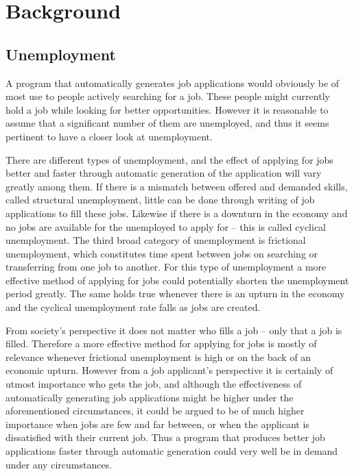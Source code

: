 \section{Background}\label{sec:background}

\subsection{Unemployment}

A program that automatically generates job applications would obviously be of
most use to people actively searching for a job. These people might currently
hold a job while looking for better opportunities. However it is reasonable to
assume that a significant number of them are unemployed, and thus it seems
pertinent to have a closer look at unemployment.

There are different types of unemployment, and the effect of applying for jobs
better and faster through automatic generation of the application will vary
greatly among them.
If there is a mismatch between offered and demanded skills, called structural
unemployment, little can be done through writing of job applications to fill
these jobs.%
Likewise if there is a downturn in the economy and no jobs are available for the
unemployed to apply for -- this is called cyclical unemployment.
The third broad category of unemployment is frictional unemployment, which
constitutes time spent between jobs on searching or transferring from one job to
another.%
For this type of unemployment a more effective method of applying for jobs could
potentially shorten the unemployment period greatly. The same holds true
whenever there is an upturn in the economy and the cyclical unemployment rate
falls as jobs are created.

From society's perspective it does not matter who fills a job -- only that a job
is filled. Therefore a more effective method for applying for jobs is mostly of
relevance whenever frictional unemployment is high or on the back of an economic
upturn.
However from a job applicant's perspective it is certainly of utmost importance
who gets the job, and although the effectiveness of automatically generating job
applications might be higher under the aforementioned circumstances, it could be
argued to be of much higher importance when jobs are few and far between, or
when the applicant is dissatisfied with their current job.
Thus a program that produces better job applications faster through automatic
generation could very well be in demand under any circumstances.

